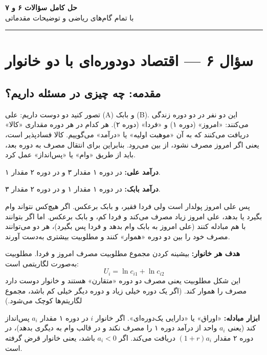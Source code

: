 \documentclass[12pt,a4paper]{article}
\begin{document}
\begin{center}
	{\Huge\bfseries\color{mainblue} حل کامل سؤالات ۶ و ۷}\\[0.5cm]
	{\large\color{darkgreen} با تمام گام‌های ریاضی و توضیحات مقدماتی}\\[0.3cm]
	{\color{mainblue}\rule{\textwidth}{1.5pt}}
\end{center}

\tableofcontents
\newpage

\section{سؤال ۶ — اقتصاد دودوره‌ای با دو خانوار}

\subsection{مقدمه: چه چیزی در مسئله داریم؟}

تصور کنید دو دوست داریم: علی (A) و بابک (B). این دو نفر در دو دوره زندگی می‌کنند: «امروز» (دوره ۱) و «فردا» (دوره ۲). هر کدام در هر دوره مقداری «کالا» دریافت می‌کنند که به آن «موهبت اولیه» یا «درآمد» می‌گوییم. کالا فسادپذیر است، یعنی اگر امروز مصرف نشود، از بین می‌رود. بنابراین برای انتقال مصرف به دوره بعد، باید از طریق «وام» یا «پس‌انداز» عمل کرد.

\textbf{درآمد علی:} در دوره ۱ مقدار ۳ و در دوره ۲ مقدار ۱.

\textbf{درآمد بابک:} در دوره ۱ مقدار ۱ و در دوره ۲ مقدار ۳.

پس علی امروز پولدار است ولی فردا فقیر، و بابک برعکس. اگر هیچ‌کس نتواند وام بگیرد یا بدهد، علی امروز زیاد مصرف می‌کند و فردا کم، و بابک برعکس. اما اگر بتوانند با هم مبادله کنند (علی امروز به بابک وام بدهد و فردا پس بگیرد)، هر دو می‌توانند مصرف خود را بین دو دوره «هموار» کنند و مطلوبیت بیشتری به‌دست آورند.

\textbf{هدف هر خانوار:} بیشینه کردن مجموع مطلوبیت مصرف امروز و فردا. مطلوبیت به‌صورت لگاریتمی است:
\[
	U_i = \ln c_{i1} + \ln c_{i2}
\]
این شکل مطلوبیت یعنی مصرف دو دوره «متقارن» هستند و خانوار دوست دارد مصرف را هموار کند. (اگر یک دوره خیلی زیاد و دوره دیگر خیلی کم باشد، مجموع لگاریتم‌ها کوچک می‌شود.)

\textbf{ابزار مبادله:} «اوراق» یا «دارایی یک‌دوره‌ای». اگر خانوار $i$ در دوره ۱ مقدار $a_i$ پس‌انداز کند (یعنی $a_i$ واحد از درآمد دوره ۱ را مصرف نکند و در قالب وام به دیگری بدهد)، در دوره ۲ مقدار $(1+r) a_i$ دریافت می‌کند. اگر $a_i < 0$ باشد، یعنی خانوار قرض گرفته است.
\end{document}
